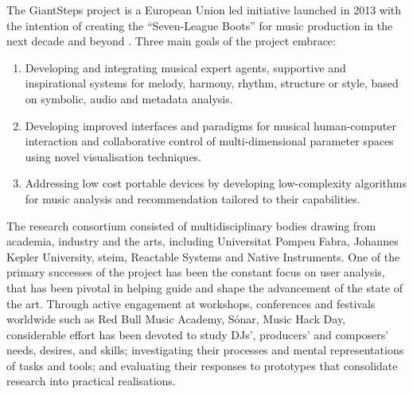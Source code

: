 %

The GiantSteps project is a European Union led initiative launched in 2013 with the intention of creating the ``Seven-League Boots'' for music production in the next decade and beyond \citep{Knees2016a}. Three main goals of the project embrace:

\begin{enumerate}
  \item Developing and integrating musical expert agents, supportive and inspirational systems for melody, harmony, rhythm, structure or style, based on symbolic, audio and metadata analysis.
  \item Developing improved interfaces and paradigms for musical human-computer interaction and collaborative control of multi-dimensional parameter spaces using novel visualisation techniques.
  \item Addressing low cost portable devices by developing low-complexity algorithms for music analysis and recommendation tailored to their capabilities.
\end{enumerate}

The research consortium consisted of multidisciplinary bodies drawing from academia, industry and the arts, including Universitat Pompeu Fabra, Johannes Kepler University, \acrshort{steim}, Reactable Systems and Native Instruments. One of the primary successes of the project has been the constant focus on user analysis, that has been pivotal in helping guide and shape the advancement of the state of the art. Through active engagement at workshops, conferences and festivals worldwide such as Red Bull Music Academy, Sónar, Music Hack Day, considerable effort has been devoted to study DJs', producers' and composers' needs, desires, and skills; investigating their processes and mental representations of tasks and tools; and evaluating their responses to prototypes that consolidate research into practical realisations.

